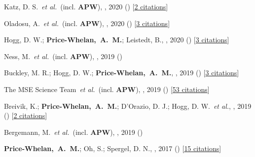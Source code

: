 \item[{\color{deemph}\scriptsize9}]Katz, D. S.~\textit{et al.}~(incl. \textbf{APW}), , 2020 () [\href{http://adsabs.harvard.edu/abs/2020arXiv201005102K}{2 citations}]

\item[{\color{deemph}\scriptsize8}]Oladosu, A.~\textit{et al.}~(incl. \textbf{APW}), , 2020 () [\href{http://adsabs.harvard.edu/abs/2020arXiv200704459O}{3 citations}]

\item[{\color{deemph}\scriptsize7}]Hogg, D. W.; \textbf{Price-Whelan,~A.~M.}; Leistedt, B., , 2020 () [\href{http://adsabs.harvard.edu/abs/2020arXiv200514199H}{3 citations}]

\item[{\color{deemph}\scriptsize6}]Ness, M.~\textit{et al.}~(incl. \textbf{APW}), , 2019 ()

\item[{\color{deemph}\scriptsize5}]Buckley, M. R.; Hogg, D. W.; \textbf{Price-Whelan,~A.~M.}, , 2019 () [\href{http://adsabs.harvard.edu/abs/2019arXiv190700987B}{3 citations}]

\item[{\color{deemph}\scriptsize4}]The MSE Science Team~\textit{et al.}~(incl. \textbf{APW}), , 2019 () [\href{http://adsabs.harvard.edu/abs/2019arXiv190404907T}{53 citations}]

\item[{\color{deemph}\scriptsize3}]Breivik, K.; \textbf{Price-Whelan,~A.~M.}; D'Orazio, D. J.; Hogg, D. W.~\textit{et al.}, , 2019 () [\href{http://adsabs.harvard.edu/abs/2019arXiv190305094B}{2 citations}]

\item[{\color{deemph}\scriptsize2}]Bergemann, M.~\textit{et al.}~(incl. \textbf{APW}), , 2019 ()

\item[{\color{deemph}\scriptsize1}]\textbf{Price-Whelan,~A.~M.}; Oh, S.; Spergel, D. N., , 2017 () [\href{http://adsabs.harvard.edu/abs/2017arXiv170903532P}{15 citations}]